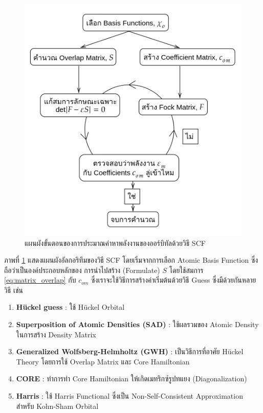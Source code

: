 \begin{figure}[htbp]
    \centering
    \includegraphics[width=0.9\linewidth]{fig/scf.png}
    \caption{แผนผังขั้นตอนของการประมาณค่าหาพลังงานของออร์บิทัลด้วยวิธี SCF}
    \label{fig:scf}
\end{figure}

ภาพที่ \ref{fig:scf} แสดงแผนผังอัลกอริทึมของวิธี SCF โดยเริ่มจากการเลือก Atomic Basis Function ซึ่งถือว่าเป็นองค์ประกอบหลักของ%
การนำไปสร้าง (Formulate) $S$ โดยใช้สมการ \eqref{eq:matrix_overlap} กับ $c_{om}$ ซึ่งเราจะใช้วิธีการสร้างค่าเริ่มต้นด้วยวิธี Guess
ซึ่งมีด้วยกันหลายวิธี เช่น

\begin{enumerate}[topsep=0pt]
    \item \textbf{H{\"u}ckel guess} : ใช้ H{\"u}ckel Orbital\autocite{jensen2017}

    \item \textbf{Superposition of Atomic Densities (SAD)} : ใช้ผลรวมของ Atomic Density ในการสร้าง Density Matrix

    \item \textbf{Generalized Wolfsberg-Helmholtz (GWH)} : เป็นวิธีการที่อาศัย H{\"u}ckel Theory โดยการใช้ Overlap
          Matrix และ Core Hamiltonian\autocite{wolfsberg1952}

    \item \textbf{CORE} : ทำการทำ Core Hamiltonian ให้เกิดเมทริกซ์รูปทแยง (Diagonalization)

    \item \textbf{Harris} : ใช้ Harris Functional ซึ่งเป็น Non-Self-Consistent Approximation สำหรับ Kohn-Sham
          Orbital\autocite{harris1985}
\end{enumerate}

